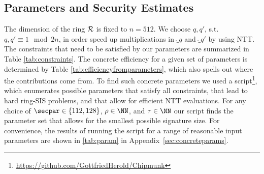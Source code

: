 \subsection{Parameters and Security Estimates}
The dimension of the ring $\mathcal{R}$ is fixed to $n=512$. We choose $q,q'$, s.t.\ $q,q'\equiv 1\mod 2n$, in order speed up multiplications in $\ring_q$ and $\ring_{q'}$ by using NTT.
The constraints that need to be satisfied by our parameters are summarized in Table \ref{tab:constraints}.
The concrete efficiency for a given set of parameters is determined by Table \ref{tab:efficiencyfromparameters}, which also spells out where the contributions come from.
To find such concrete parameters we used a script\footnote{\label{fn:github}\url{https://github.com/GottfriedHerold/Chipmunk}}, which enumerates possible parameters that satisfy all constraints, that lead to hard ring-SIS problems, and that allow for efficient NTT evaluations.
For any choice of $\secpar\in\{112,128\}$, $\rho\in\NN$, and $\tau\in\NN$ our script finds the parameter set that allows for the smallest possible signature size.
For convenience, the results of running the script for a range of reasonable input parameters are shown in \autoref{tab:param} in Appendix~\ref{sec:concreteparams}.
